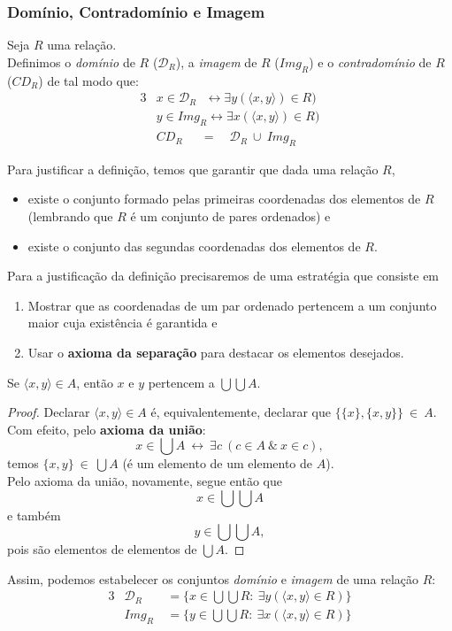 \subsubsection{Domínio, Contradomínio e Imagem}
\begin{definition}
  Seja $R$ uma relação.\\
  Definimos o \textit{domínio} de $R$ ($\mathcal{D}_{R}$), a \textit{imagem} de $R$ ($\mathit{Img}_{R}$) e o \textit{contradomínio} de $R$ ($\mathit{CD}_{R}$) de tal modo que:
  \begin{alignat*}{3}
    & x \in \mathcal{D}_{R}\ \ \ \leftrightarrow \exists y (\langle x, y \rangle) \in R)\\
    & y \in \mathit{Img}_{R} \leftrightarrow \exists x (\langle x, y \rangle) \in R)\\
    & \mathit{CD}_{R}\quad \ \ =\quad \mathcal{D}_{R}\ \cup\ \mathit{Img}_{R}
  \end{alignat*}
\end{definition}
Para justificar a definição, temos que garantir que dada uma relação $R$,
  \begin{itemize}
    \item existe o conjunto formado pelas primeiras coordenadas dos elementos de $R$ (lembrando que $R$ é um conjunto de pares ordenados) e
    \item existe o conjunto das segundas coordenadas dos elementos de $R.$
  \end{itemize}
Para a justificação da definição precisaremos de uma estratégia que consiste em
  \begin{enumerate}
    \item Mostrar que as coordenadas de um par ordenado pertencem a um conjunto maior cuja existência é garantida e
    \item Usar o \textbf{axioma da separação} para destacar os elementos desejados.
  \end{enumerate}
\begin{lemma}
  Se $\langle x, y \rangle \in A$, então $x$ e $y$ pertencem a $\bigcup \bigcup A.$
\end{lemma} 
\begin{proof}
  Declarar $\langle x, y \rangle \in A$ é, equivalentemente, declarar que $\{\{x\},\{x,y\}\}\ \in\ A$.\\
  Com efeito, pelo \textbf{axioma da união}:
  $$x \in \bigcup A\ \leftrightarrow\ \exists c\ (c \in A\ \&\ x \in c),$$
  temos $\{x,y\}\ \in\ \bigcup A$ (é um elemento de um elemento de $A$).\\
  Pelo axioma da união, novamente, segue então que $$x \in \bigcup \bigcup A$$
  e também
  $$y \in \bigcup \bigcup A,$$
  pois são elementos de elementos de $\bigcup A.$
\end{proof}
Assim, podemos estabelecer os conjuntos \textit{domínio} e \textit{imagem} de uma relação $R$:
\begin{alignat*}{3}
  & \mathcal{D}_{R}& \ = \{x \in \bigcup \bigcup R:\ \exists y (\langle x, y \rangle \in R) \}\\
  & \mathit{Img}_{R}& \ = \{y \in \bigcup \bigcup R:\ \exists x (\langle x, y \rangle \in R)\}
\end{alignat*}

